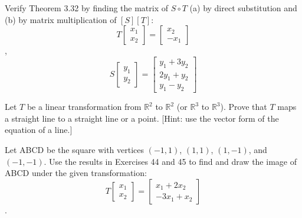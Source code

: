\documentclass[11pt,letterpaper,boxed]{hmcpset}
\begin{document}
\begin{solution}
    \vfill
\end{solution}

\newpage


\begin{problem}[3.6 \#32]
    Verify Theorem 3.32 by finding the matrix of $S \circ T$ (a) by direct substitution and (b) by matrix multiplication of $[S] [T]$: \[
    T\begin{bmatrix}
    x_1 \\ x_2
    \end{bmatrix}= 
    \begin{bmatrix}
    x_2 \\ -x_1
    \end{bmatrix}
    \],
    \[
    S\begin{bmatrix}
    y_1 \\ y_2
    \end{bmatrix}= 
    \begin{bmatrix}
    y_1 + 3y_2 \\ 2y_1 + y_2 \\ y_1 - y_2
    \end{bmatrix}
    \]
\end{problem}

\begin{solution}
    \vfill
\end{solution}

\newpage


\begin{problem}[3.6 \#44]
    Let $T$ be a linear transformation from $\mathbb{R}^2$ to $\mathbb{R}^2$ (or $\mathbb{R}^3$ to $\mathbb{R}^3$). Prove that $T$ maps a straight line to a straight line or a point. [Hint: use the vector form of the equation of a line.]
\end{problem}

\begin{solution}
    \vfill
\end{solution}

\newpage


\begin{problem}[3.6 \#50]
    Let ABCD be the square with vertices $(-1, 1)$, $(1, 1)$, $(1, -1)$, and $(-1, -1)$. Use the results in Exercises 44 and 45 to find and draw the image of ABCD under the given transformation:
    \[T\begin{bmatrix}
    x_1 \\ x_2
    \end{bmatrix}=
    \begin{bmatrix}
    x_1 + 2x_2 \\ -3x_1 + x_2
    \end{bmatrix}
    \].
\end{problem}
\end{document}
